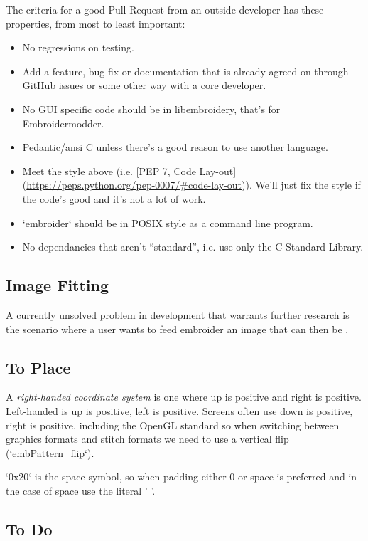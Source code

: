 \documentclass{report}
\begin{document}
The criteria for a good Pull Request from an outside developer has these properties, from most to least important:

\begin{itemize}
\item No regressions on testing.
\item Add a feature, bug fix or documentation that is already agreed on through GitHub issues or some other way with a core developer.
\item No GUI specific code should be in libembroidery, that's for Embroidermodder.
\item Pedantic/ansi C unless there's a good reason to use another language.
\item Meet the style above (i.e. [PEP 7, Code Lay-out](\url{https://peps.python.org/pep-0007/#code-lay-out})). We'll just fix the style if the code's good and it's not a lot of work.
\item `embroider` should be in POSIX style as a command line program.
\item No dependancies that aren't ``standard'', i.e. use only the C Standard Library.
\end{itemize}

\subsection{Image Fitting}

A currently unsolved problem in development that warrants further research is
the scenario where a user wants to feed embroider an image that can then be .

\subsection{To Place}

A \emph{right-handed coordinate system} is one where up is positive and right is
positive. Left-handed is up is positive, left is positive. Screens often use
down is positive, right is positive, including the OpenGL standard so when
switching between graphics formats and stitch formats we need to use a vertical
flip (`embPattern\_flip`).

`0x20` is the space symbol, so when padding either 0 or space is preferred and in the case of space use the literal ' '.

\subsection{To Do}
\end{document}
